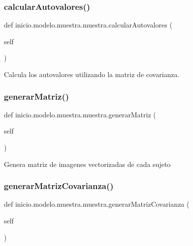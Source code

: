 \subsubsection{\texorpdfstring{calcular\+Autovalores()}{calcularAutovalores()}}
{\footnotesize\ttfamily def inicio.\+modelo.\+muestra.\+muestra.\+calcular\+Autovalores (\begin{DoxyParamCaption}\item[{}]{self }\end{DoxyParamCaption})}

\begin{DoxyVerb}Calcula los autovalores utilizando la matriz de covarianza.
\end{DoxyVerb}
 \mbox{\label{classinicio_1_1modelo_1_1muestra_1_1muestra_aa851f3e02e1b300574d4b4e6d56584e9}} 
\subsubsection{\texorpdfstring{generar\+Matriz()}{generarMatriz()}}
{\footnotesize\ttfamily def inicio.\+modelo.\+muestra.\+muestra.\+generar\+Matriz (\begin{DoxyParamCaption}\item[{}]{self }\end{DoxyParamCaption})}

\begin{DoxyVerb}Genera matriz de imagenes vectorizadas de cada sujeto
\end{DoxyVerb}
 \mbox{\label{classinicio_1_1modelo_1_1muestra_1_1muestra_a395c113c5874b3f561737696d6658584}} 
\subsubsection{\texorpdfstring{generar\+Matriz\+Covarianza()}{generarMatrizCovarianza()}}
{\footnotesize\ttfamily def inicio.\+modelo.\+muestra.\+muestra.\+generar\+Matriz\+Covarianza (\begin{DoxyParamCaption}\item[{}]{self }\end{DoxyParamCaption})}

